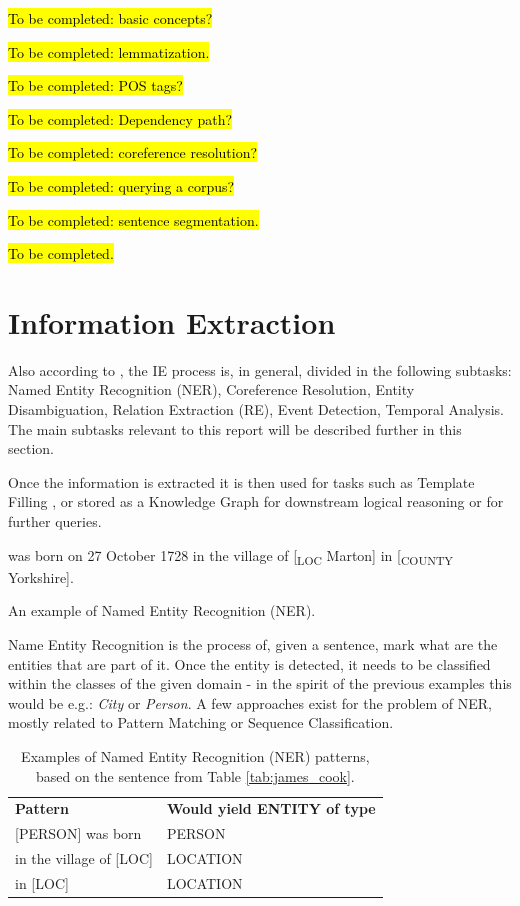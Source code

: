 \documentclass[11pt,a4paper,openright]{memoir}
\begin{document}
\hl{To be completed: basic concepts?}

\hl{To be completed: lemmatization.}

\hl{To be completed: POS tags?}

\hl{To be completed: Dependency path?}

\hl{To be completed: coreference resolution?}

\hl{To be completed: querying a corpus?}

\hl{To be completed: sentence segmentation.}

\hl{To be completed.}


%
%
%
%


\section{Information Extraction}

Also according to \cite{Jurafsky:2000:SLP:555733}, the IE process is, in general, divided in the following subtasks: Named Entity Recognition (NER), Coreference Resolution, Entity Disambiguation, Relation Extraction (RE), Event Detection, Temporal Analysis. The main subtasks relevant to this report will be described further in this section.

Once the information is extracted it is then used for tasks such as Template Filling \cite{Jurafsky:2000:SLP:555733}, or stored as a Knowledge Graph for downstream logical reasoning or for further queries.

\begin{table}[!htbp]
  \centering
   was born on 27 October 1728 in the village of [\textsubscript{LOC} Marton] in [\textsubscript{COUNTY} Yorkshire].
  \caption[An example of NER.]{An example of Named Entity Recognition (NER).}
  \label{tab:james_cook}
\end{table}

Name Entity Recognition is the process of, given a sentence, mark what are the entities that are part of it. Once the entity is detected, it needs to be classified within the classes of the given domain - in the spirit of the previous examples this would be e.g.: \emph{City} or \emph{Person}. A few approaches exist for the problem of NER, mostly related to Pattern Matching or Sequence Classification.

\begin{table}[!htbp]
  \centering
    \begin{tabular}{ll}
      \textbf{Pattern}          & \textbf{Would yield ENTITY of type} \\
      {[PERSON]} was born       & PERSON            \\
      in the village of {[LOC]} & LOCATION          \\
      in {[LOC]}                & LOCATION           
    \end{tabular}
  \caption[Patterns for NER.]{Examples of Named Entity Recognition (NER) patterns, based on the sentence from Table \ref{tab:james_cook}.}
  \label{tab:james_cook_patterns}
\end{table}
\end{document}
